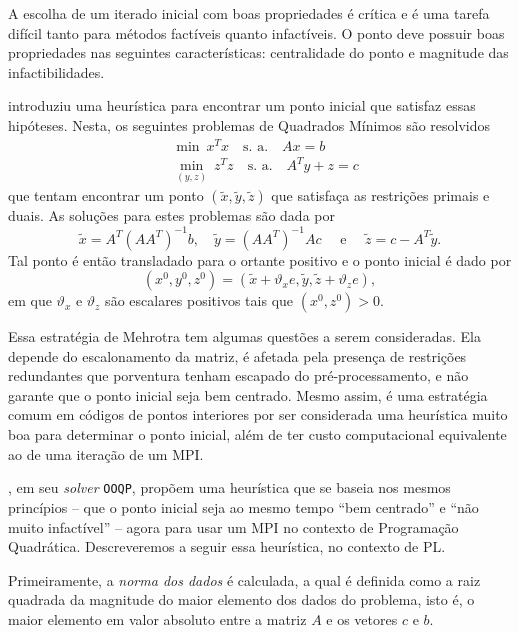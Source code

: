 A escolha de um iterado inicial com boas
propriedades é crítica e é uma tarefa difícil tanto para métodos factíveis
quanto infactíveis. O ponto deve possuir boas propriedades nas
seguintes características: centralidade do ponto e magnitude das
infactibilidades.
 
\textcite{Mehrotra:1992wr}
introduziu uma heurística para encontrar um ponto inicial que satisfaz essas hipóteses.
Nesta, os seguintes problemas de Quadrados Mínimos são resolvidos
\begin{align*}
&\min\: x^Tx\quad \text{s. a.}\quad Ax = b \\
&\min_{(y,z)}\: z^Tz\quad \text{s. a.}\quad A^Ty + z = c 
\end{align*}
que tentam encontrar um ponto $(\tilde{x},\tilde{y},\tilde{z})$ que satisfaça as restrições primais e
duais. As soluções para estes problemas são dada por 
\[
\tilde{x} = A^T(AA^T)^{-1}b, \quad \tilde{y} = (AA^T)^{-1}Ac\quad \text{ e }
\quad \tilde{z} = c - A^T\tilde{y}.
\]
Tal ponto é então transladado para o ortante positivo e o ponto inicial é
dado por
\begin{equation}
	\label{eq:initial-point-mehrotra}
(x^0,y^0,z^0) = (\tilde{x}+ \vartheta_x e,\tilde{y},\tilde{z}+\vartheta_z e),
\end{equation}
em que $\vartheta_x$ e $\vartheta_ z$ são escalares positivos tais que
$(x^0,z^0)>0$.

Essa estratégia de Mehrotra tem algumas questões a serem consideradas. Ela
depende do escalonamento da matriz, é afetada pela presença de restrições
redundantes que porventura tenham escapado do pré-processamento, e não garante
que o ponto inicial seja bem centrado. Mesmo assim, é uma estratégia comum em
códigos de pontos interiores por ser considerada uma heurística muito boa para
determinar o ponto inicial, além de ter custo computacional equivalente ao de
uma iteração de um \ac{MPI}.

\textcite{Gertz:2003ji},	  em seu \emph{solver} \texttt{OOQP}, propõem uma
heurística que se baseia nos mesmos princípios -- que o ponto inicial seja ao mesmo tempo
``bem centrado'' e ``não muito infactível'' -- agora para usar um \ac{MPI} no
contexto de Programação Quadrática. Descreveremos a seguir essa heurística, no
contexto de \ac{PL}. 

Primeiramente, a \emph{norma dos dados} é calculada, a qual é definida como a raiz
quadrada da magnitude do maior elemento dos dados do problema, isto é, o maior
elemento em valor absoluto entre a matriz $A$ e os vetores $c$ e  $b$.

